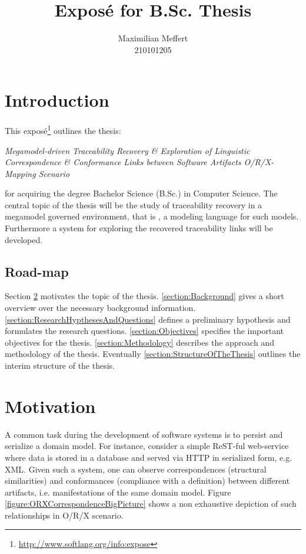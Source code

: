 \documentclass[runningheads,a4paper]{llncs}
\title{Exposé for B.Sc. Thesis}
\subtitle{\thesis}
\author{Maximilian Meffert\\210101205}
\institute{University of Koblenz-Landau}
\newcommand{\megal}{\text{MegaL}}
\newcommand{\thesis}{Megamodel-driven Traceability Recovery \& Exploration of Linguistic Correspondence \& Conformance Links between Software Artifacts O/R/X-Mapping Scenario}
\begin{document}
\maketitle
%


\section{Introduction}
This exposé\footnote{\url{http://www.softlang.org/info:expose}} outlines the thesis:
\begin{center}
\it
\thesis
\end{center}
for acquiring the degree Bachelor Science (B.Sc.) in Computer Science.
The central topic of the thesis will be the study of traceability recovery in a megamodel governed environment, that is \megal, a modeling language for such models. Furthermore a system for exploring the recovered traceability links will be developed.

\subsection{Road-map}
Section \ref{section:Motivation} motivates the topic of the thesis.
\ref{section:Background} gives a short overview over the necessary background information.
\ref{section:ResearchHypthesesAndQuestions} defines a preliminary hypothesis and formulates the research questions.
\ref{section:Objectives} specifies the important objectives for the thesis.
\ref{section:Methodology} describes the approach and methodology of the thesis.
Eventually \ref{section:StructureOfTheThesis} outlines the interim structure of the thesis.


\section{Motivation}
\label{section:Motivation}
A common task during the development of software systems is to persist and serialize a domain model.
For instance, consider a simple ReST-ful web-service where data is stored in a database and served via HTTP in serialized form, e.g. XML.
Given such a system, one can observe correspondences (structural similarities) and conformances (compliance with a definition) between different artifacts, i.e. manifestations of the same domain model.
Figure \ref{figure:ORXCorrespondenceBigPicture} shows a non exhaustive depiction of such relationships in O/R/X scenario.
\end{document}
